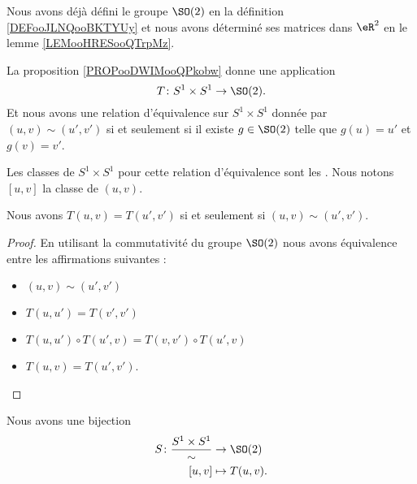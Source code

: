 Nous avons déjà défini le groupe \( \SO(2)\) en la définition \ref{DEFooJLNQooBKTYUy} et nous avons déterminé ses matrices dans \( \eR^2\) en le lemme \ref{LEMooHRESooQTrpMz}. 

La proposition \ref{PROPooDWIMooQPkobw} donne une application
\begin{equation}
    T\colon S^1\times S^1\to \SO(2).
\end{equation}
Et nous avons une relation d'équivalence sur \( S^1\times S^1\) donnée par \( (u,v)\sim(u',v')\) si et seulement si il existe \( g\in\SO(2)\) telle que \( g(u)=u'\) et \( g(v)=v'\). 

\begin{definition}      \label{DEFooVBKIooWlHvod}
    Les classes de \( S^1\times S^1\) pour cette relation d'équivalence sont les . Nous notons \( [u,v]\) la classe de \( (u,v)\).
\end{definition}

\begin{proposition}     \label{PROPooIWJQooGQJBWR}
    Nous avons \( T(u,v)=T(u',v')\) si et seulement si \( (u,v)\sim(u',v')\).
\end{proposition}

\begin{proof}
    En utilisant la commutativité du groupe \( \SO(2)\) nous avons équivalence entre les affirmations suivantes :
    \begin{itemize}
        \item \( (u,v)\sim (u',v')\)
        \item \( T(u,u')=T(v',v')\)
        \item \( T(u,u')\circ T(u',v)=T(v,v')\circ T(u',v)\)
        \item
            \( T(u,v)=T(u',v')\).
    \end{itemize}
\end{proof}

\begin{proposition}
    Nous avons une bijection
    \begin{equation}
        \begin{aligned}
            S\colon \frac{ S^1\times S^1 }{ \sim }&\to \SO(2) \\
            [u,v]&\mapsto T(u,v). 
        \end{aligned}
    \end{equation}
\end{proposition}

